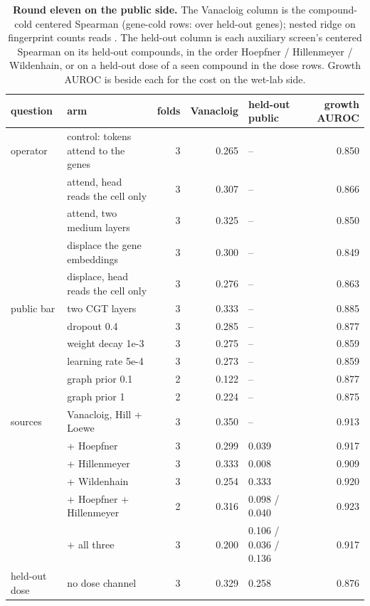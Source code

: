 \begin{table}[htbp]\centering\footnotesize
\caption{\textbf{Round eleven on the public side.} The Vanacloig column is the compound-cold centered Spearman (gene-cold rows: over held-out genes); nested ridge on fingerprint counts reads \hydladderRidge{}. The held-out column is each auxiliary screen's centered Spearman on its held-out compounds, in the order Hoepfner / Hillenmeyer / Wildenhain, or on a held-out dose of a seen compound in the dose rows. Growth AUROC is beside each for the cost on the wet-lab side.}\label{tab:r11public}
\begin{tabular}{llrrlr}
\toprule
question & arm & folds & Vanacloig & held-out public & growth AUROC \\
\midrule
operator & control: tokens attend to the genes & 3 & 0.265 & -- & 0.850 \\
 & attend, head reads the cell only & 3 & 0.307 & -- & 0.866 \\
 & attend, two medium layers & 3 & 0.325 & -- & 0.850 \\
 & displace the gene embeddings & 3 & 0.300 & -- & 0.849 \\
 & displace, head reads the cell only & 3 & 0.276 & -- & 0.863 \\
\midrule
public bar & two CGT layers & 3 & 0.333 & -- & 0.885 \\
 & dropout 0.4 & 3 & 0.285 & -- & 0.877 \\
 & weight decay 1e-3 & 3 & 0.275 & -- & 0.859 \\
 & learning rate 5e-4 & 3 & 0.273 & -- & 0.859 \\
 & graph prior 0.1 & 2 & 0.122 & -- & 0.877 \\
 & graph prior 1 & 2 & 0.224 & -- & 0.875 \\
\midrule
sources & Vanacloig, Hill + Loewe & 3 & 0.350 & -- & 0.913 \\
 & + Hoepfner & 3 & 0.299 & 0.039 & 0.917 \\
 & + Hillenmeyer & 3 & 0.333 & 0.008 & 0.909 \\
 & + Wildenhain & 3 & 0.254 & 0.333 & 0.920 \\
 & + Hoepfner + Hillenmeyer & 2 & 0.316 & 0.098 / 0.040 & 0.923 \\
 & + all three & 3 & 0.200 & 0.106 / 0.036 / 0.136 & 0.917 \\
\midrule
held-out dose & no dose channel & 3 & 0.329 & 0.258 & 0.876 \\

\end{tabular}
\end{table}
